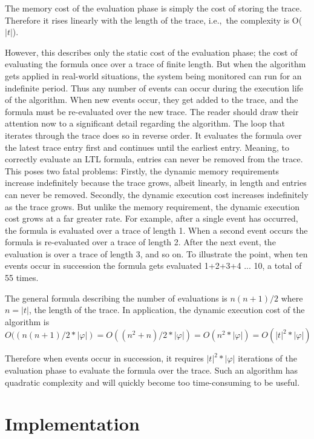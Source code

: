 The memory cost of the evaluation phase is simply the cost of storing the trace.  Therefore it rises linearly with the length of the trace, i.e.,\ the complexity is O($ | t | $).

However, this describes only the static cost of the evaluation phase; the cost of evaluating the formula once over a trace of finite length.  But when the algorithm gets applied in real-world situations, the system being monitored can run for an indefinite period.  Thus any number of events can occur during the execution life of the algorithm.  When new events occur, they get added to the trace, and the formula must be re-evaluated over the new trace.  The reader should draw their attention now to a significant detail regarding the algorithm.  The loop that iterates through the trace does so in reverse order.  It evaluates the formula over the latest trace entry first and continues until the earliest entry.  Meaning, to correctly evaluate an LTL formula, entries can never be removed from the trace.  This poses two fatal problems:  Firstly, the dynamic memory requirements increase indefinitely because the trace grows, albeit linearly, in length and entries can never be removed.  Secondly, the dynamic execution cost increases indefinitely as the trace grows.  But unlike the memory requirement, the dynamic execution cost grows at a far greater rate.  For example, after a single event has occurred, the formula is evaluated over a trace of length 1.  When a second event occurs the formula is re-evaluated over a trace of length 2.  After the next event, the evaluation is over a trace of length 3, and so on.  To illustrate the point, when ten events occur in succession the formula gets evaluated 1+2+3+4 ... 10, a total of 55 times.

The general formula describing the number of evaluations is $ n(n+1)/2 $ where $ n = | t |$, the length of the trace.  In application, the dynamic execution cost of the algorithm is $$O((n(n+1)/2 * |\varphi |) = O((n^2+n)/2 * | \varphi |) = O(n^2 * |\varphi |) = O(| t |^2 * |\varphi |)$$

Therefore when events occur in succession, it requires $ | t |^2 * | \varphi | $ iterations of the evaluation phase to evaluate the formula over the trace.  Such an algorithm has quadratic complexity and will quickly become too time-consuming to be useful.

\section{Implementation}
\label{sec:RosuHavelundImplementation}

